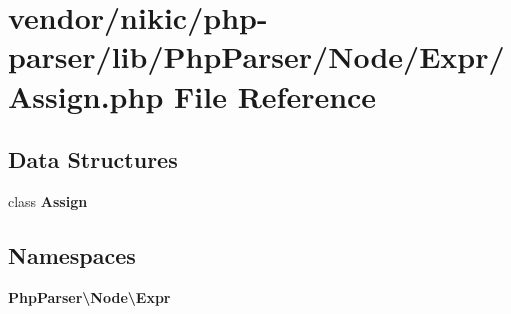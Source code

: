 \section{vendor/nikic/php-\/parser/lib/\+Php\+Parser/\+Node/\+Expr/\+Assign.php File Reference}
\label{_assign_8php}
\subsection*{Data Structures}
\begin{DoxyCompactItemize}
\item 
class {\bf Assign}
\end{DoxyCompactItemize}
\subsection*{Namespaces}
\begin{DoxyCompactItemize}
\item 
 {\bf Php\+Parser\textbackslash{}\+Node\textbackslash{}\+Expr}
\end{DoxyCompactItemize}

